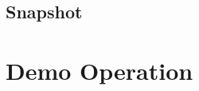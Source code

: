 \documentclass[11pt]{article}
\begin{document}
\subsection{Snapshot}
\label{sec-4-5}
\section{Demo Operation}
\label{sec-5}
\end{document}
